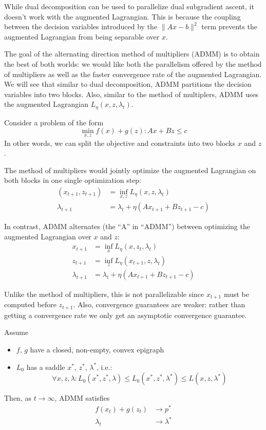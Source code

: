While dual decomposition can be used to parallelize dual subgradient ascent,
it doesn't work with the augmented Lagrangian. This is because the coupling between
the decision variables introduced by the $\| A x - b \|^2$ term prevents
the augmented Lagrangian from being separable over $x$.

The goal of the alternating direction method of multipliers (ADMM) is to obtain
the best of both worlds: we would like both the parallelism offered by the method
of multipliers as well as the faster convergence rate of the augmented Lagrangian.
We will see that similar to dual decomposition, ADMM partitions
the decision variables into two blocks. Also, similar to the method of multiplers,
ADMM uses the augmented Lagrangian $L_\eta(x,z,\lambda_t)$.

Consider a problem of the form
\[
\min_{x,z} f(x) + g(z) : A x + B z \leq c
\]
In other words, we can split the objective and constraints into two blocks $x$ and $z$.

The method of multipliers would jointly optimize the augmented Lagrangian
on both blocks in one single optimization step:
\begin{align}
(x_{t+1}, z_{t+1}) &= \inf_{x,z} L_\eta(x,z,\lambda_t)\\
\lambda_{t+1} &= \lambda_t + \eta(A x_{t+1} + B z_{t+1} - c)
\end{align}

In contrast, ADMM alternates (the ``A'' in ``ADMM'') between optimizing
the augmented Lagrangian over $x$ and $z$:
\begin{align}
x_{t+1} &= \inf_{x} L_\eta(x, z_t, \lambda_t) \\
z_{t+1} &= \inf_{z} L_\eta(x_{t+1}, z, \lambda_t) \\
\lambda_{t+1} &= \lambda_t + \eta(A x_{t+1} + B z_{t+1} - c)
\end{align}

Unlike the method of multipliers, this is not parallelizable
since $x_{t+1}$ must be computed before $z_{t+1}$. Also, convergence
guarantees are weaker: rather than getting a convergence rate we only get an asymptotic
convergence guarantee.

\begin{theorem}
Assume
\begin{itemize}
\item $f$, $g$ have a closed, non-empty, convex
epigraph
\item $L_0$ has a saddle $x^*$, $z^*$, $\lambda^*$, i.e.:
\[
\forall x,z,\lambda: L_0(x^*,z^*,\lambda) \leq L_0(x^*,z^*,\lambda^*)\leq L(x,z,\lambda^*)
\]
\end{itemize}
Then, as $t \to \infty$, ADMM satisfies
\begin{align}
f(x_t) + g(z_t) &\to p^*\\
\lambda_t &\to \lambda^*
\end{align}
\end{theorem}

